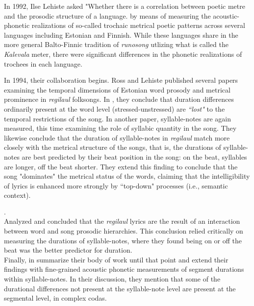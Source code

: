 %
In 1992, Ilse Lehiste asked "Whether there is a correlation between poetic metre and the prosodic structure of a language.\citep{lehiste1992} by means of measuring the acoustic-phonetic realizations of so-called trochaic metrical poetic patterns across several languages including Estonian and Finnish. While these languages share in the more general Balto-Finnic tradition of {\it runosong} utlizing what is called the {\it Kalevala} meter, there were significant differences in the phonetic realizations of trochees in each language. 


In 1994, their collaboration begins. Ross and Lehiste published several papers examining the temporal dimensions of Estonian word prosody and metrical prominence in {\it regilaul} folksongs. In \citep{rossLehiste1994}, they conclude that duration differences ordinarily present at the word level (stressed-unstressed) are {\it ``lost"} to the temporal restrictions of the song. In another paper, syllable-notes are again measured, this time examining the role of syllabic quantity in the song. They likewise conclude that the duration of syllable-notes in {\it regilaul} match more closely with the metrical structure of the songs, that is, the durations of syllable-notes are best predicted by their beat position in the song: on the beat, syllables are longer, off the beat shorter. They extend this finding to conclude that the song "dominates" the metrical status of the words, claiming that the intelligibility of lyrics is enhanced more strongly by ``top-down" processes (i.e., semantic context). 

\citep{rossLehiste1996}. \\

\citep{rossLehiste1998} Analyzed and concluded that the {\it regilaul} lyrics are the result of an interaction between word and song prosodic hierarchies. This conclusion relied critically on measuring the durations of syllable-notes, where they found being on or off the beat was the better predictor for duration. \\


Finally, in \citep{rossLehiste2001} summarize their body of work until that point and extend their findings with fine-grained acoustic phonetic measurements of segment durations within syllable-notes. In their discussion, they mention that some of the durational differences not present at the syllable-note level are present at the segmental level, in complex codas. 

